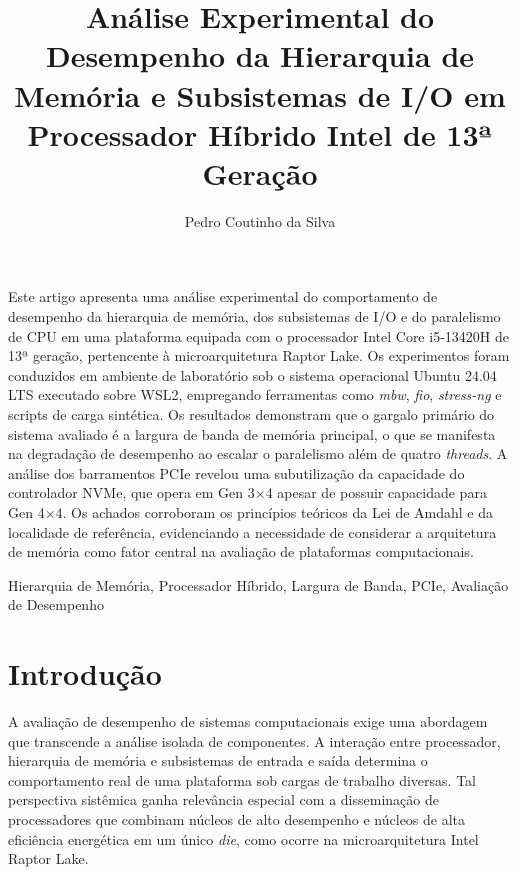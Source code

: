 \documentclass[12pt]{article}
\title{Análise Experimental do Desempenho da Hierarquia de Memória e Subsistemas de I/O em Processador Híbrido Intel de 13ª Geração}
\author{Pedro Coutinho da Silva\inst{1}}
\begin{document}
\maketitle

\begin{resumo}
Este artigo apresenta uma análise experimental do comportamento de desempenho da hierarquia de memória, dos subsistemas de I/O e do paralelismo de CPU em uma plataforma equipada com o processador Intel Core i5-13420H de 13ª geração, pertencente à microarquitetura Raptor Lake. Os experimentos foram conduzidos em ambiente de laboratório sob o sistema operacional Ubuntu 24.04 LTS executado sobre WSL2, empregando ferramentas como \textit{mbw}, \textit{fio}, \textit{stress-ng} e scripts de carga sintética. Os resultados demonstram que o gargalo primário do sistema avaliado é a largura de banda de memória principal, o que se manifesta na degradação de desempenho ao escalar o paralelismo além de quatro \textit{threads}. A análise dos barramentos PCIe revelou uma subutilização da capacidade do controlador NVMe, que opera em Gen 3×4 apesar de possuir capacidade para Gen 4×4. Os achados corroboram os princípios teóricos da Lei de Amdahl e da localidade de referência, evidenciando a necessidade de considerar a arquitetura de memória como fator central na avaliação de plataformas computacionais.
\end{resumo}

\begin{chave}
Hierarquia de Memória, Processador Híbrido, Largura de Banda, PCIe, Avaliação de Desempenho
\end{chave}

\section{Introdução}

A avaliação de desempenho de sistemas computacionais exige uma abordagem que transcende a análise isolada de componentes. A interação entre processador, hierarquia de memória e subsistemas de entrada e saída determina o comportamento real de uma plataforma sob cargas de trabalho diversas. Tal perspectiva sistêmica ganha relevância especial com a disseminação de processadores que combinam núcleos de alto desempenho e núcleos de alta eficiência energética em um único \textit{die}, como ocorre na microarquitetura Intel Raptor Lake.
\end{document}

